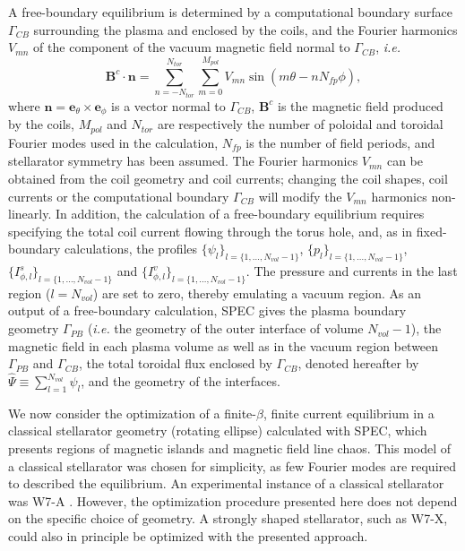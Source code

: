 \documentclass[my_thesis.tex]{subfiles}
\begin{document}
A free-boundary equilibrium is determined by a computational boundary surface $\Gamma_{CB}$ surrounding the plasma and enclosed by the coils, and the Fourier harmonics $V_{mn}$ of the component of the vacuum magnetic field normal to $\Gamma_{CB}$, \textit{i.e.}
\begin{equation}
    \mathbf{B}^c\cdot\mathbf{n} = \sum_{n=-N_{tor}}^{N_{tor}}\sum_{m=0}^{M_{pol}} V_{mn} \sin(m\theta-nN_{fp}\phi),
\end{equation}
where $\mathbf{n}=\mathbf{e}_\theta\times \mathbf{e}_\phi$ is a vector normal to $\Gamma_{CB}$, $\mathbf{B}^c$ is the magnetic field produced by the coils, $M_{pol}$ and $N_{tor}$ are respectively the number of poloidal and toroidal Fourier modes used in the calculation, $N_{fp}$ is the number of field periods, and stellarator symmetry has been assumed. The Fourier harmonics $V_{mn}$ can be obtained from the coil geometry and coil currents; changing the coil shapes, coil currents or the computational boundary $\Gamma_{CB}$ will modify the $V_{mn}$ harmonics non-linearly. In addition, the calculation of a free-boundary equilibrium requires specifying the total coil current flowing through the torus hole, and, as in fixed-boundary calculations, the profiles $\{\psi_{l}\}_{l=\{1,\ldots,N_{vol}-1\}}$,  $\{p_l\}_{l=\{1,\ldots,N_{vol}-1\}}$,  $\{I^s_{\phi,l}\}_{l=\{1,\ldots,N_{vol}-1\}}$ and $\{I^v_{\phi,l}\}_{l=\{1,\ldots,N_{vol}-1\}}$. The pressure and currents in the last region ($l=N_{vol}$) are set to zero, thereby emulating a vacuum region.  As an output of a free-boundary calculation, SPEC gives the plasma boundary geometry $\Gamma_{PB}$ (\textit{i.e.} the geometry of the outer interface of volume $N_{vol}-1$), the magnetic field in each plasma volume as well as in the vacuum region between $\Gamma_{PB}$ and $\Gamma_{CB}$, the total toroidal flux enclosed by $\Gamma_{CB}$, denoted hereafter by $\widehat\Psi\equiv\sum_{l=1}^{N_{vol}} \psi_l$, and the geometry of the interfaces.

We now consider the optimization of a finite-$\beta$, finite current equilibrium in a classical stellarator geometry (rotating ellipse) calculated with \ac{SPEC}, which presents regions of magnetic islands and magnetic field line chaos. This model of a classical stellarator was chosen for simplicity, as few Fourier modes are required to described the equilibrium. An experimental instance of a classical stellarator was \ac{W7-A} \cite{Grieger1985}. However, the optimization procedure presented here does not depend on the specific choice of geometry. A strongly shaped stellarator, such as \ac{W7-X}, could also in principle be optimized with the presented approach.
\end{document}
